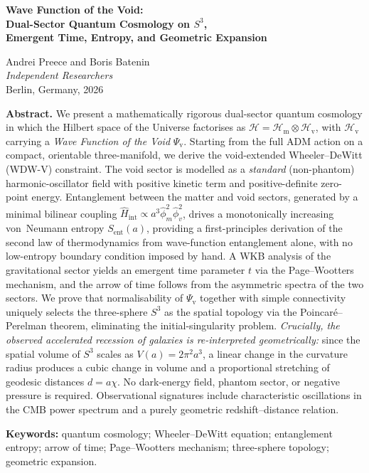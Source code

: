 \documentclass[12pt,a4paper]{article}
\theoremstyle{plain}
\theoremstyle{definition}
\newcommand{\Hil}{\mathscr{H}}
\newcommand{\HilM}{\mathscr{H}_{\mathrm{m}}}
\newcommand{\HilV}{\mathscr{H}_{\mathrm{v}}}
\newcommand{\Psiv}{\Psi_{\mathrm{v}}}
\newcommand{\Hint}{\hat{H}_{\mathrm{int}}}
\newcommand{\Sent}{S_{\mathrm{ent}}}
\begin{document}
\onehalfspacing

\begin{center}
{\LARGE\bfseries Wave Function of the Void:\\[4pt]
Dual-Sector Quantum Cosmology on $S^3$,\\[4pt]
Emergent Time, Entropy, and Geometric Expansion}

\bigskip
{\large Andrei Preece and Boris Batenin}\\[4pt]
{\itshape Independent Researchers}\\[4pt]
{\small Berlin, Germany, 2026}

\bigskip\bigskip
\begin{minipage}{0.89\textwidth}
\small{}
\textbf{Abstract.}
We present a mathematically rigorous dual-sector quantum cosmology in which
the Hilbert space of the Universe factorises as
$\Hil = \HilM\otimes\HilV$, with $\HilV$ carrying a
\emph{Wave Function of the Void} $\Psiv$.
Starting from the full ADM action on a compact, orientable three-manifold,
we derive the void-extended Wheeler--DeWitt (WDW-V) constraint.
The void sector is modelled as a \emph{standard} (non-phantom)
harmonic-oscillator field with positive kinetic term and positive-definite
zero-point energy.
Entanglement between the matter and void sectors, generated by a minimal
bilinear coupling $\Hint \propto a^3\hat\phi_m^2\hat\phi_v^2$, drives a
monotonically increasing von~Neumann entropy $\Sent(a)$, providing a
first-principles derivation of the second law of thermodynamics from
wave-function entanglement alone, with no low-entropy boundary condition
imposed by hand.
A WKB analysis of the gravitational sector yields an emergent time
parameter $t$ via the Page--Wootters mechanism, and the arrow of time
follows from the asymmetric spectra of the two sectors.
We prove that normalisability of $\Psiv$ together with simple connectivity
uniquely selects the three-sphere $S^3$ as the spatial topology via
the Poincar\'e--Perelman theorem, eliminating the initial-singularity
problem.
\emph{Crucially, the observed accelerated recession of galaxies is
re-interpreted geometrically:} since the spatial volume of $S^3$ scales as
$V(a) = 2\pi^2 a^3$, a linear change in the curvature radius produces a
cubic change in volume and a proportional stretching of geodesic distances
$d = a\chi$.
No dark-energy field, phantom sector, or negative pressure is required.
Observational signatures include characteristic oscillations in the CMB
power spectrum and a purely geometric redshift--distance relation.

\medskip\noindent
\textbf{Keywords:} quantum cosmology; Wheeler--DeWitt equation;
entanglement entropy; arrow of time; Page--Wootters mechanism;
three-sphere topology; geometric expansion.
\end{minipage}
\end{center}
\end{document}

